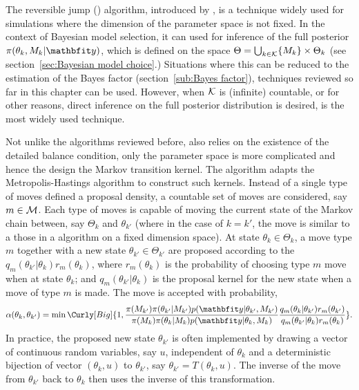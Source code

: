 The reversible jump \mcmc (\rjmcmc) algorithm, introduced by
\cite{Green:1995dg}, is a technique widely used for simulations where the
dimension of the parameter space is not fixed. In the context of Bayesian
model selection, it can used for inference of the full posterior
$\pi(\theta_k,M_k|\data)$, which is defined on the space $\Theta =
\bigcup_{k\in\mathcal{K}}\{M_k\}\times\Theta_k$ (see section~\ref{sec:Bayesian model
  choice}.) Situations where this can be reduced to the estimation of the
Bayes factor (section~\ref{sub:Bayes factor}), techniques reviewed so far in
this chapter can be used. However, when $\mathcal{K}$ is (infinite) countable, or
for other reasons, direct inference on the full posterior distribution is
desired, \rjmcmc is the most widely used technique.

Not unlike the \mcmc algorithms reviewed before, \rjmcmc also relies on the
existence of the detailed balance condition, only the parameter space is more
complicated and hence the design the Markov transition kernel. The \rjmcmc
algorithm adapts the Metropolis-Hastings algorithm to construct such kernels.
Instead of a single type of moves defined a proposal density, a countable set
of moves are considered, say $m\in\mathcal{M}$. Each type of moves is capable of
moving the current state of the Markov chain between, say $\Theta_k$ and
$\theta_{k'}$ (where in the case of $k = k'$, the move is similar to a those
in a \mcmc algorithm on a fixed dimension space). At state
$\theta_k\in\Theta_k$, a move type $m$ together with a new state
$\theta_{k'}\in\Theta_{k'}$ are proposed according to the
$q_m(\theta_{k'}|\theta_k)r_m(\theta_k)$, where $r_m(\theta_k)$ is the
probability of choosing type $m$ move when at state $\theta_k$; and
$q_m(\theta_{k'}|\theta_k)$ is the proposal kernel for the new state when a move
of type $m$ is made. The move is accepted with probability,
\begin{equation}
  \alpha(\theta_k,\theta_{k'}) =
  \min\Curly[Big]{1,
    \frac{\pi(M_{k'})\pi(\theta_{k'}|M_{k'})p(\data|\theta_{k'},M_{k'})}
    {\pi(M_k)\pi(\theta_k|M_k)p(\data|\theta_k,M_k)}
    \frac{q_m(\theta_k|\theta_{k'})r_m(\theta_{k'})}
    {q_m(\theta_{k'}|\theta_k)r_m(\theta_k)}
  }.
\end{equation}
In practice, the proposed new state $\theta_{k'}$ is often implemented by
drawing a vector of continuous random variables, say $u$, independent of
$\theta_k$ and a deterministic bijection of vector $(\theta_k,u)$ to
$\theta_{k'}$, say $\theta_{k'} = T(\theta_k,u)$. The inverse of the move from
$\theta_{k'}$ back to $\theta_k$ then uses the inverse of this transformation.
